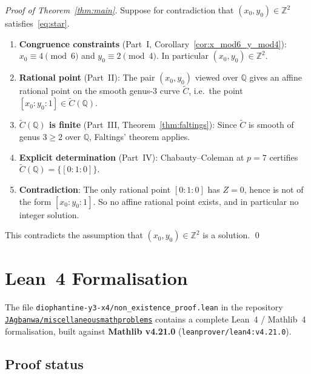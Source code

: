 \documentclass[12pt, a4paper]{article}
\theoremstyle{definition}
\newcommand{\Z}{\mathbb{Z}}
\newcommand{\Q}{\mathbb{Q}}
\begin{document}
\begin{proof}[Proof of Theorem~\ref{thm:main}]
  Suppose for contradiction that $(x_0, y_0) \in \Z^2$ satisfies~\eqref{eq:star}.
  \begin{enumerate}[label=\textbf{Step \arabic*.}, leftmargin=*, noitemsep]
    \item \textbf{Congruence constraints} (Part~I, Corollary~\ref{cor:x_mod6_y_mod4}):
          $x_0 \equiv 4 \pmod{6}$ and $y_0 \equiv 2 \pmod{4}$.
          In particular $(x_0, y_0) \in \Z^2$.

    \item \textbf{Rational point} (Part~II): The pair $(x_0, y_0)$ viewed over $\Q$
          gives an affine rational point on the smooth genus-3 curve $\widetilde{C}$,
          i.e.\ the point $[x_0 : y_0 : 1] \in \widetilde{C}(\Q)$.

    \item \textbf{$\widetilde{C}(\Q)$ is finite} (Part~III, Theorem~\ref{thm:faltings}):
          Since $\widetilde{C}$ is smooth of genus $3 \geq 2$ over $\Q$, Faltings'
          theorem applies.

    \item \textbf{Explicit determination} (Part~IV): Chabauty--Coleman at $p=7$
          certifies $\widetilde{C}(\Q) = \{[0:1:0]\}$.

    \item \textbf{Contradiction}: The only rational point $[0:1:0]$ has $Z=0$,
          hence is not of the form $[x_0:y_0:1]$.  So no affine rational point
          exists, and in particular no integer solution.
  \end{enumerate}
  This contradicts the assumption that $(x_0, y_0) \in \Z^2$ is a solution. \qed
\end{proof}

\section{Lean~4 Formalisation}\label{sec:lean}

The file \texttt{diophantine-y3-x4/non\_existence\_proof.lean} in the repository
\href{https://github.com/JAgbanwa/miscellaneousmathproblems}%
  {\texttt{JAgbanwa/miscellaneousmathproblems}}
contains a complete Lean~4 / Mathlib~4 formalisation, built against
\textbf{Mathlib v4.21.0} (\texttt{leanprover/lean4:v4.21.0}).

\subsection{Proof status}
\end{document}
